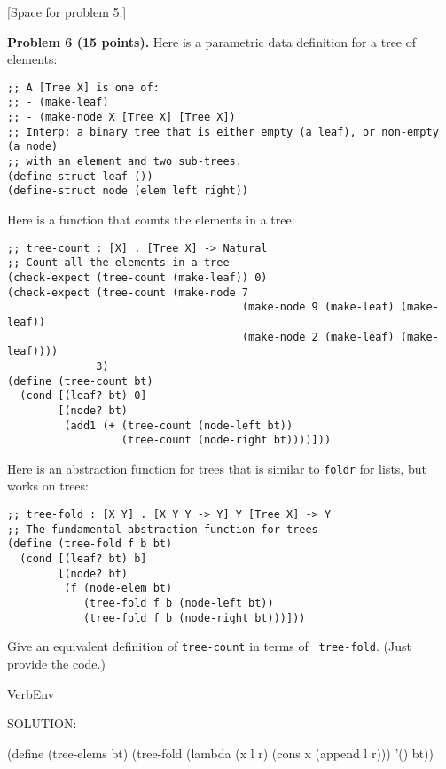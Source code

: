 \documentclass[12pt]{article}
\begin{document}


\newpage

[Space for problem 5.]


\newpage 
\noindent
{\bf Problem 6 (15 points).}
%
Here is a parametric data definition for a tree of elements:
\begin{verbatim}
;; A [Tree X] is one of:
;; - (make-leaf)
;; - (make-node X [Tree X] [Tree X])
;; Interp: a binary tree that is either empty (a leaf), or non-empty (a node)
;; with an element and two sub-trees.
(define-struct leaf ())
(define-struct node (elem left right))
\end{verbatim}

\noindent
Here is a function that counts the elements in a tree:
\begin{verbatim}
;; tree-count : [X] . [Tree X] -> Natural
;; Count all the elements in a tree
(check-expect (tree-count (make-leaf)) 0)
(check-expect (tree-count (make-node 7 
                                     (make-node 9 (make-leaf) (make-leaf))
                                     (make-node 2 (make-leaf) (make-leaf))))
              3)
(define (tree-count bt)
  (cond [(leaf? bt) 0]
        [(node? bt)
         (add1 (+ (tree-count (node-left bt))
                  (tree-count (node-right bt))))]))
\end{verbatim}
Here is an abstraction function for trees that is similar to
{\tt foldr} for lists, but works on trees:
\begin{verbatim}
;; tree-fold : [X Y] . [X Y Y -> Y] Y [Tree X] -> Y
;; The fundamental abstraction function for trees
(define (tree-fold f b bt)
  (cond [(leaf? bt) b]
        [(node? bt)
         (f (node-elem bt)
            (tree-fold f b (node-left bt))
            (tree-fold f b (node-right bt)))]))
\end{verbatim}
Give an equivalent definition of {\tt tree-count} in terms of {\tt
  tree-fold}.  (Just provide the code.)

\vspace{1em}

\begin{SaveVerbatim}{VerbEnv}


SOLUTION:

(define (tree-elems bt)
  (tree-fold (lambda (x l r) (cons x (append l r))) '() bt))

\end{SaveVerbatim}

\end{document}
